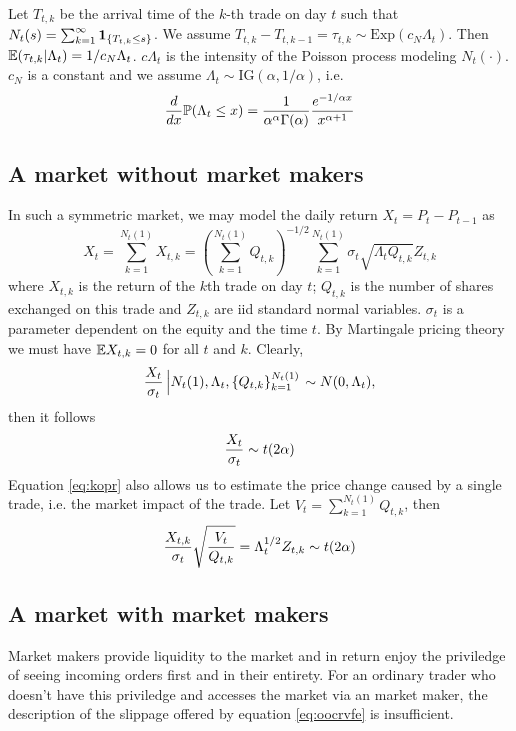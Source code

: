 Let $T_{t, k}$ be the arrival time of the $k$-th trade on day $t$ such
that $N_t(s) = \sum_{k=1}^\infty \1{T_{t, k} \leq s}$.
We assume $T_{t, k} - T_{t, k-1} = \tau_{t,k} \sim
\text{Exp}(c_N \Lambda_t)$. Then $\E(\tau_{t, k} | \Lambda_t) =
1/c_N \Lambda_t$. $c \Lambda_t$ is the intensity of the Poisson process
modeling $N_t(\cdot)$. $c_N$ is a constant and we assume $\Lambda_t \sim
\text{IG}(\alpha, 1/\alpha)$, i.e.
\[
  \frac{d}{dx} \P(\Lambda_t \leq x)
  =
  {1 \over \alpha^\alpha \Gamma(\alpha)}
  {e^{-1/\alpha x} \over x^{\alpha + 1}}
\]

\subsection{A market without market makers}
In such a symmetric market,  we may model the daily return $X_t = P_t - P_{t-1}$ as
\begin{equation}
  \label{eq:kopr}
  X_t
  =
  \sum_{k=1}^{N_t(1)} X_{t,k}
  =
  \left( \sum_{k=1}^{N_t(1)} Q_{t,k} \right)^{-1/2}
  \sum_{k=1}^{N_t(1)}
  \sigma_t
  \sqrt{
    \Lambda_t Q_{t,k}
  } Z_{t, k}
\end{equation}
where $X_{t,k}$ is the return of the $k$th trade on day $t$;
$Q_{t,k}$ is the number of shares exchanged on this trade and
$Z_{t,k}$ are iid standard normal variables. $\sigma_t$ is a parameter
dependent on the equity and the time $t$. By Martingale pricing theory
we must have $\E X_{t,k} = 0$ for all $t$ and $k$. Clearly,
\[
  {X_t \over \sigma_t}
  \left|
    N_t(1), \Lambda_t, \{Q_{t,k}\}_{k=1}^{N_t(1)}
  \right. \sim N(0, \Lambda_t),
\]
then it follows
\begin{equation}
  \label{eq:jirtfg}
  {X_t \over \sigma_t} \sim t(2\alpha)
\end{equation}
Equation \eqref{eq:kopr} also allows us to estimate the price change
caused by a single trade, i.e. the market impact of the trade.
Let $V_t = \sum_{k=1}^{N_t(1)} Q_{t, k}$, then
\begin{equation}
  \label{eq:oocrvfe}
  {X_{t, k} \over \sigma_t}
  \sqrt{V_t \over Q_{t,k}}
  =
  \Lambda_t^{1/2} Z_{t,k}
  \sim
  t(2\alpha)
\end{equation}

\subsection{A market with market makers}
Market makers provide liquidity to the market and in return enjoy the
priviledge of seeing incoming orders first and in their entirety. For
an ordinary trader who doesn't have this priviledge and accesses the
market via an market maker, the description of the slippage offered
by equation \eqref{eq:oocrvfe} is insufficient.

